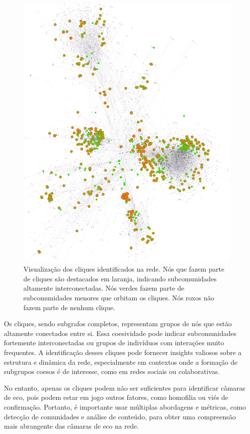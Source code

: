 \begin{figure}[!hbtp]
	\centering
	\includegraphics[scale=0.45]{images/colab-cliques.png}
	\caption{Visualização dos cliques identificados na rede. Nós que fazem parte de cliques são destacados em laranja, indicando subcomunidades altamente interconectadas. Nós verdes fazem parte de subcomunidades menores que orbitam os cliques. Nós roxos não fazem parte de nenhum clique.}
	\label{fig:gephi_cliques}
	\fautor
\end{figure}

Os cliques, sendo subgrafos completos, representam grupos de nós que estão altamente conectados entre si. Essa coesividade pode indicar subcomunidades fortemente interconectadas ou grupos de indivíduos com interações muito frequentes. A identificação desses cliques pode fornecer insights valiosos sobre a estrutura e dinâmica da rede, especialmente em contextos onde a formação de subgrupos coesos é de interesse, como em redes sociais ou colaborativas.

No entanto, apenas os cliques podem não ser suficientes para identificar câmaras de eco, pois podem estar em jogo outros fatores, como homofilia ou viés de confirmação. Portanto, é importante usar múltiplas abordagens e métricas, como detecção de comunidades e análise de conteúdo, para obter uma compreensão mais abrangente das câmaras de eco na rede.

